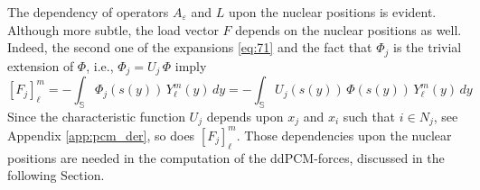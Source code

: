 The dependency of operators $A_\varepsilon$ and $L$ upon the nuclear positions is evident. Although more subtle, the load vector $F$ depends on the nuclear positions as well. Indeed, the second one of the expansions \eqref{eq:71} and the fact that $\Phi_j$ is the trivial extension of $\Phi$, i.e., $\Phi_j = U_j \, \Phi$ imply
\begin{equation}\label{eq:25}
[F_j]_\ell^m = - \int_{\mathbb{S}} \Phi_j(s(y)) \, Y_\ell^m(y) \,dy = - \int_{\mathbb{S}} U_j(s(y)) \, \Phi(s(y)) \, Y_\ell^m(y) \,dy
\end{equation}
Since the characteristic function $U_j$ depends upon $x_j$ and $x_i$ such that $i \in N_j$, see Appendix \ref{app:pcm_der}, so does $[F_j]_\ell^m$. Those dependencies upon the nuclear positions are needed in the computation of the ddPCM-forces, discussed in the following Section.


%
%
%

